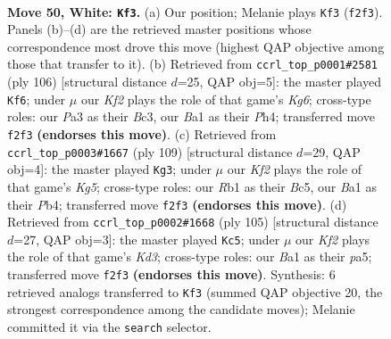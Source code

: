 \documentclass[11pt]{article}
\begin{document}
\clearpage

\begin{figure}[p]\centering
\begin{subfigure}{0.46\textwidth}\centering
\resizebox{\linewidth}{!}{%
\newchessgame
\chessboard[
  setfen={6k1/3n4/4r3/8/p1p3P1/P1P4p/2P2K1P/BR6 w - - 5 50},
  showmover=false,
  pgfstyle=straightmove, color=movearrow, markmove={f2-f3}
]}
\caption{}
\end{subfigure}\hfill
\begin{subfigure}{0.46\textwidth}\centering
\resizebox{\linewidth}{!}{%
\newchessgame
\chessboard[
  setfen={4k3/2p5/2n1p1K1/2P1P3/4P2P/2B4R/6r1/8 w - - 13 54},
  showmover=false,
  pgfstyle=straightmove, color=movearrow, markmove={g6-f6}
]}
\caption{}
\end{subfigure}
\\[4pt]
\begin{subfigure}{0.46\textwidth}\centering
\resizebox{\linewidth}{!}{%
\newchessgame
\chessboard[
  setfen={8/5R2/p2p4/P1b5/1pP3k1/8/KPB5/4r3 b - - 0 55},
  showmover=false,
  pgfstyle=straightmove, color=movearrow, markmove={g4-g3}
]}
\caption{}
\end{subfigure}\hfill
\begin{subfigure}{0.46\textwidth}\centering
\resizebox{\linewidth}{!}{%
\newchessgame
\chessboard[
  setfen={8/p4p2/3k2p1/PP2p1P1/4P3/2K5/R7/3r4 b - - 0 53},
  showmover=false,
  pgfstyle=straightmove, color=movearrow, markmove={d6-c5}
]}
\caption{}
\end{subfigure}
\caption{\textbf{Move 50, White: \texttt{Kf3}.} (a) Our position; Melanie plays \texttt{Kf3} (\texttt{f2f3}). Panels (b)--(d) are the retrieved master positions whose correspondence most drove this move (highest QAP objective among those that transfer to it). (b) Retrieved from \texttt{ccrl\_top\_p0001\#2581} (ply 106) [structural distance $d$=25, QAP obj=5]: the master played \texttt{Kf6}; under $\mu$ our \emph{Kf2} plays the role of that game's \emph{Kg6}; cross-type roles: our \emph{P}a3 as their \emph{B}c3, our \emph{B}a1 as their \emph{P}h4; transferred move \texttt{f2f3} \textbf{(endorses this move)}. (c) Retrieved from \texttt{ccrl\_top\_p0003\#1667} (ply 109) [structural distance $d$=29, QAP obj=4]: the master played \texttt{Kg3}; under $\mu$ our \emph{Kf2} plays the role of that game's \emph{Kg5}; cross-type roles: our \emph{R}b1 as their \emph{B}c5, our \emph{B}a1 as their \emph{P}b4; transferred move \texttt{f2f3} \textbf{(endorses this move)}. (d) Retrieved from \texttt{ccrl\_top\_p0002\#1668} (ply 105) [structural distance $d$=27, QAP obj=3]: the master played \texttt{Kc5}; under $\mu$ our \emph{Kf2} plays the role of that game's \emph{Kd3}; cross-type roles: our \emph{B}a1 as their \emph{p}a5; transferred move \texttt{f2f3} \textbf{(endorses this move)}. Synthesis: 6 retrieved analogs transferred to \texttt{Kf3} (summed QAP objective 20, the strongest correspondence among the candidate moves); Melanie committed it via the \texttt{search} selector.}
\label{fig:thought-m98}
\end{figure}
\end{document}
